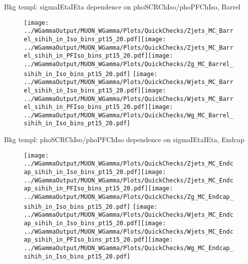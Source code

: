 \documentclass{beamer}
\begin{document}
\begin{frame}{Bkg templ: sigmaIEtaIEta dependence on phoSCRChIso/phoPFChIso, Barrel}
  \begin{figure}
    \centering
    \texttt{[image: ../WGammaOutput/MUON\_WGamma/Plots/QuickChecks/Zjets\_MC\_Barrel\_sihih\_in\_Iso\_bins\_pt15\_20.pdf]}\texttt{[image: ../WGammaOutput/MUON\_WGamma/Plots/QuickChecks/Zjets\_MC\_Barrel\_sihih\_in\_PFIso\_bins\_pt15\_20.pdf]}\texttt{[image: ../WGammaOutput/MUON\_WGamma/Plots/QuickChecks/Zg\_MC\_Barrel\_sihih\_in\_Iso\_bins\_pt15\_20.pdf]}
    \texttt{[image: ../WGammaOutput/MUON\_WGamma/Plots/QuickChecks/Wjets\_MC\_Barrel\_sihih\_in\_Iso\_bins\_pt15\_20.pdf]}\texttt{[image: ../WGammaOutput/MUON\_WGamma/Plots/QuickChecks/Wjets\_MC\_Barrel\_sihih\_in\_PFIso\_bins\_pt15\_20.pdf]}\texttt{[image: ../WGammaOutput/MUON\_WGamma/Plots/QuickChecks/Wg\_MC\_Barrel\_sihih\_in\_Iso\_bins\_pt15\_20.pdf]}
  \end{figure}
\end{frame}

\begin{frame}{Bkg templ: phoSCRChIso/phoPFChIso dependence on sigmaIEtaIEta, Endcap}
  \begin{figure}
    \centering
    \texttt{[image: ../WGammaOutput/MUON\_WGamma/Plots/QuickChecks/Zjets\_MC\_Endcap\_sihih\_in\_Iso\_bins\_pt15\_20.pdf]}\texttt{[image: ../WGammaOutput/MUON\_WGamma/Plots/QuickChecks/Zjets\_MC\_Endcap\_sihih\_in\_PFIso\_bins\_pt15\_20.pdf]}\texttt{[image: ../WGammaOutput/MUON\_WGamma/Plots/QuickChecks/Zg\_MC\_Endcap\_sihih\_in\_Iso\_bins\_pt15\_20.pdf]}
    \texttt{[image: ../WGammaOutput/MUON\_WGamma/Plots/QuickChecks/Wjets\_MC\_Endcap\_sihih\_in\_Iso\_bins\_pt15\_20.pdf]}\texttt{[image: ../WGammaOutput/MUON\_WGamma/Plots/QuickChecks/Wjets\_MC\_Endcap\_sihih\_in\_PFIso\_bins\_pt15\_20.pdf]}\texttt{[image: ../WGammaOutput/MUON\_WGamma/Plots/QuickChecks/Wg\_MC\_Endcap\_sihih\_in\_Iso\_bins\_pt15\_20.pdf]}
  \end{figure}
\end{frame}
\end{document}

